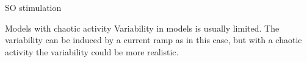 \documentclass[aspectratio=43]{beamer}
\begin{document}
\begin{frame}{SO stimulation}
\begin{figure}[hbt!]
\begin{minipage}[b]{0.44\textwidth}
\begin{minipage}[b]{\textwidth}
					\end{minipage}
				\end{minipage}
			\end{figure}
			
			
\end{frame}


\begin{frame}{Models with chaotic activity}
	Variability in models is usually limited. The variability can be induced by a current ramp as in this case, but with a chaotic activity the variability could be more realistic. 
	\vspace{8pt}
	\begin{columns}
\end{columns}
\end{frame}
\end{document}
